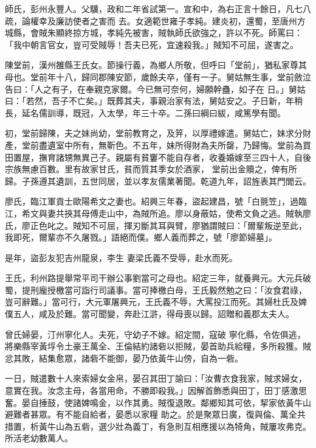 \begin{pinyinscope}
 師氏，彭州永豐人。父驥，政和二年省試第一。宣和中，為右正言十餘日，凡七八疏，論權幸及廉訪使者之害而
 去。女適範世雍子孝純。建炎初，還蜀，至唐州方城縣，會賊朱顯終掠方城，孝純先被害，賊執師氏欲強之，許以不死。師罵曰：「我中朝言官女，豈可受賊辱！吾夫已死，宜速殺我。」賊知不可屈，遂害之。



 陳堂前，漢州雒縣王氏女。節操行義，為鄉人所敬，但呼曰「堂前」，猶私家尊其母也。堂前年十八，歸同郡陳安節，歲餘夫卒，僅有一子。舅姑無生事，堂前斂泣告曰：「人之有子，在奉親克家爾。今已無可奈何，婦願幹蠱，如子在
 日。」舅姑曰：「若然，吾子不亡矣。」既葬其夫，事親治家有法，舅姑安之。子日新，年稍長，延名儒訓導，既冠，入太學，年三十卒。二孫曰綱曰紱，咸篤學有聞。



 初，堂前歸陳，夫之妹尚幼，堂前教育之，及笄，以厚禮嫁遣。舅姑亡，妹求分財產，堂前盡遺室中所有，無靳色。不五年，妹所得財為夫所罄，乃歸悔。堂前為買田置屋，撫育諸甥無異己子。親屬有貧窶不能自存者，收養婚嫁至三四十人，自後宗族無慮百數。里有故家甘氏，貧而質其季女於酒家，
 堂前出金贖之，俾有所歸。子孫遵其遺訓，五世同居，並以孝友儒業著聞。乾道九年，詔旌表其門閭云。



 廖氏，臨江軍貢士歐陽希文之妻也。紹興三年春，盜起建昌，號「白氈笠」，過臨江，希文與妻共挾其母傅走山中，為賊所追。廖以身蔽姑，使希文負之逃。賊執廖氏，廖正色叱之。賊知不可屈，揮刃斷其耳與臂，廖猶謂賊曰：「爾輩叛逆至此，我即死，爾輩亦不久屠戮。」語絕而僕。鄉人義而葬之，號「廖節婦墓」。



 是年，盜彭友犯吉州龍泉，李生
 妻梁氏義不受辱，赴水而死。



 王氏，利州路提舉常平司干辦公事劉當可之母也。紹定三年，就養興元。大元兵破蜀，提刑龐授檄當可詣行司議事。當可捧檄白母，王氏毅然勉之曰：「汝食君祿，豈可辭難。」當可行，大元軍屠興元，王氏義不辱，大罵投江而死。其婦杜氏及婢僕五人，咸及於難。當可聞變，奔赴江滸，得母喪以歸。詔贈和義郡太夫人。



 曾氏婦晏，汀州寧化人。夫死，守幼子不嫁。紹定間，寇破
 寧化縣，令佐俱逃，將樂縣宰黃垺令土豪王萬全、王倫結約諸砦以拒賊，晏首助兵給糧，多所殺獲。賊忿其敗，結集愈眾，諸砦不能御，晏乃依黃牛山傍，自為一砦。



 一日，賊遣數十人來索婦女金帛，晏召其田丁諭曰：「汝曹衣食我家，賊求婦女，意實在我。汝念主母，各當用命，不勝即殺我。」因解首飾悉與田丁，田丁感激思奮。晏自捶鼓，使諸婢鳴金，以作其勇。賊復退敗。鄰鄉知其可依，挈家依黃牛山避難者甚眾。有不能自給者，晏悉以家糧
 助之。於是聚眾日廣，復與倫、萬全共措置，析黃牛山為五砦，選少壯為義丁，有急則互相應援以為犄角，賊屢攻弗克。所活老幼數萬人。




\end{pinyinscope}
